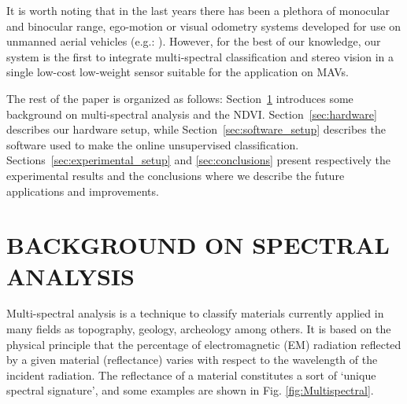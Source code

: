 \documentclass[letterpaper, 10pt, conference]{ieeeconf}      %
\newcommand{\paolo}[1]{{\textcolor{red}{#1}}}
\begin{document}
It is worth noting that in the last years there has been a plethora of monocular and binocular range, ego-motion or visual odometry systems developed for use on unmanned aerial vehicles (e.g.: \cite{2013_YanSchZel, 2014_DewTijRemDec, 2014_ForPizSca}).
However, for the best of our knowledge, our system is the first to integrate multi-spectral classification and stereo vision in a single low-cost low-weight sensor suitable for the application on MAVs.



The rest of the paper is organized as follows: Section~\ref{sec:background} introduces some background on multi-spectral analysis and the NDVI.
Section~\ref{sec:hardware} describes our hardware setup, while Section~\ref{sec:software_setup} describes the software used to make the online unsupervised classification. Sections~\ref{sec:experimental_setup} and \ref{sec:conclusions} present respectively the experimental results and the conclusions where we describe the future applications and improvements.




%





\section{BACKGROUND ON SPECTRAL ANALYSIS}\label{sec:background}

Multi-spectral analysis is a technique to classify materials currently applied in many fields as topography, geology, archeology among others.
It is based on  the physical principle that the percentage of electromagnetic (EM) radiation reflected by a given material (reflectance) varies with respect to the wavelength of the incident radiation.
The reflectance of a material constitutes a sort of `unique spectral signature', and some examples are shown in Fig. \ref{fig:Multispectral}.
\end{document}
